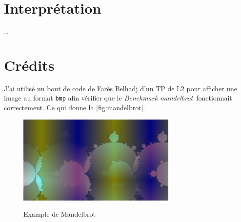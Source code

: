 \documentclass[a4paper]{article}
\def\btwo{\textit{Benchmark mandelbrot}}
\begin{document}
\section{Interprétation}
\dots

\clearpage
\appendix
\section{Crédits}

J'ai utilisé un bout de code de \href{https://expreg.org/amsi/C/}{Farès Belhadj}
d'un TP de L2 pour afficher une image au format \texttt{bmp} afin vérifier que
le \btwo~fonctionnait correctement. Ce qui donne la \autoref{fig:mandelbrot}.

\begin{figure}[h!]
  \centering
  \includegraphics[alt={Fractale mandelbrot},width=0.7\textwidth]{imgs/mandelbrot.jpg}
  \caption{Example de Mandelbrot}
  \label{fig:mandelbrot}
\end{figure}
\end{document}
